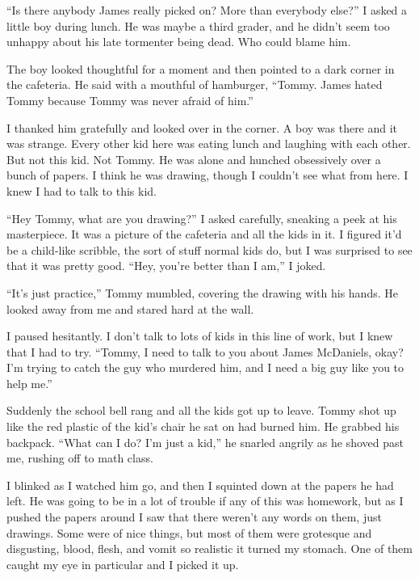 ``Is there anybody James really picked on? More than everybody
else?'' I asked a little boy during lunch. He was maybe a
third grader, and he didn't seem too unhappy about his late
tormenter being dead. Who could blame him.



The boy looked thoughtful for a moment and then pointed to a dark
corner in the cafeteria. He said with a mouthful of hamburger,
``Tommy. James hated Tommy because Tommy was never afraid of
him.''



I thanked him gratefully and looked over in the corner. A boy was
there and it was strange. Every other kid here was eating lunch and
laughing with each other. But not this kid. Not Tommy. He was alone
and hunched obsessively over a bunch of papers. I think he was
drawing, though I couldn't see what from here. I knew I had
to talk to this kid.



``Hey Tommy, what are you drawing?'' I asked carefully,
sneaking a peek at his masterpiece. It was a picture of the
cafeteria and all the kids in it. I figured it'd be a
child-like scribble, the sort of stuff normal kids do, but I was
surprised to see that it was pretty good. ``Hey, you're
better than I am,'' I joked.



``It's just practice,'' Tommy mumbled, covering the
drawing with his hands. He looked away from me and stared hard at
the wall.



I paused hesitantly. I don't talk to lots of kids in this
line of work, but I knew that I had to try. ``Tommy, I need to
talk to you about James McDaniels, okay? I'm trying to catch
the guy who murdered him, and I need a big guy like you to help
me.''



Suddenly the school bell rang and all the kids got up to leave.
Tommy shot up like the red plastic of the kid's chair he sat
on had burned him. He grabbed his backpack. ``What can I do?
I'm just a kid,'' he snarled angrily as he shoved past
me, rushing off to math class.



I blinked as I watched him go, and then I squinted down at the
papers he had left. He was going to be in a lot of trouble if any
of this was homework, but as I pushed the papers around I saw that
there weren't any words on them, just drawings. Some were of
nice things, but most of them were grotesque and disgusting, blood,
flesh, and vomit so realistic it turned my stomach. One of them
caught my eye in particular and I picked it up.



